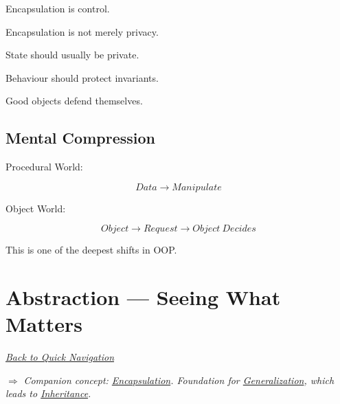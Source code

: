 \documentclass[11pt,a4paper]{book}
\begin{document}
\begin{rosettarule}

Encapsulation is control.

\end{rosettarule}

\begin{rosettarule}

Encapsulation is not merely privacy.

\end{rosettarule}

\begin{rosettarule}

State should usually be private.

\end{rosettarule}

\begin{rosettarule}

Behaviour should protect invariants.

\end{rosettarule}

\begin{rosettarule}

Good objects defend themselves.

\end{rosettarule}


\section{Mental Compression}

Procedural World:

\[
Data
\rightarrow
Manipulate
\]

Object World:

\[
Object
\rightarrow
Request
\rightarrow
Object\ Decides
\]

This is one of the deepest shifts in OOP.

\chapter{Abstraction --- Seeing What Matters}\label{chap:abstraction}

\smallskip
\noindent
\hyperref[sec:quick_nav]{\emph{Back to Quick Navigation}}

\smallskip
\noindent
\textcolor{RosettaRoyalPurple}{$\Rightarrow$}
\emph{Companion concept: \hyperref[chap:encapsulation]{Encapsulation}. Foundation for \hyperref[chap:generalization]{Generalization}, which leads to \hyperref[chap:inheritance]{Inheritance}.}
\end{document}
